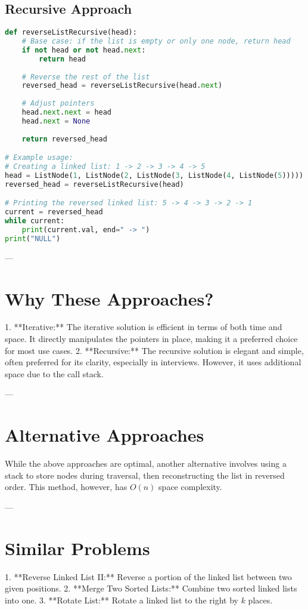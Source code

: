 \subsection*{Recursive Approach}
\begin{fullwidth}
\begin{lstlisting}[language=Python]
def reverseListRecursive(head):
    # Base case: if the list is empty or only one node, return head
    if not head or not head.next:
        return head
    
    # Reverse the rest of the list
    reversed_head = reverseListRecursive(head.next)
    
    # Adjust pointers
    head.next.next = head
    head.next = None
    
    return reversed_head

# Example usage:
# Creating a linked list: 1 -> 2 -> 3 -> 4 -> 5
head = ListNode(1, ListNode(2, ListNode(3, ListNode(4, ListNode(5)))))
reversed_head = reverseListRecursive(head)

# Printing the reversed linked list: 5 -> 4 -> 3 -> 2 -> 1
current = reversed_head
while current:
    print(current.val, end=" -> ")
print("NULL")
\end{lstlisting}
\end{fullwidth}

---

\section*{Why These Approaches?}
1. **Iterative:** The iterative solution is efficient in terms of both time and space. It directly manipulates the pointers in place, making it a preferred choice for most use cases.
2. **Recursive:** The recursive solution is elegant and simple, often preferred for its clarity, especially in interviews. However, it uses additional space due to the call stack.

---

\section*{Alternative Approaches}
While the above approaches are optimal, another alternative involves using a stack to store nodes during traversal, then reconstructing the list in reversed order. This method, however, has \(O(n)\) space complexity.

---

\section*{Similar Problems}
1. **Reverse Linked List II:** Reverse a portion of the linked list between two given positions.
2. **Merge Two Sorted Lists:** Combine two sorted linked lists into one.
3. **Rotate List:** Rotate a linked list to the right by \(k\) places.

